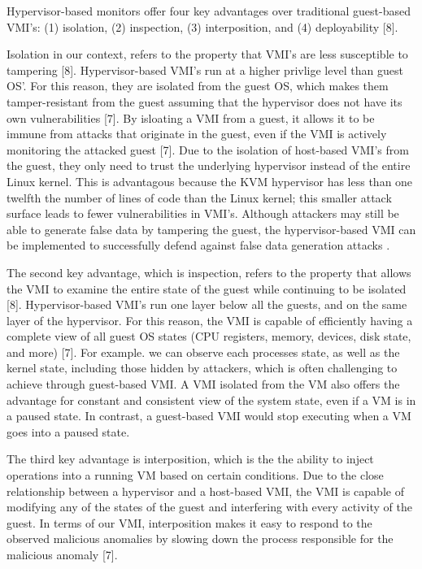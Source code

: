 \documentclass{report}
\begin{document}
\begin{spacing}{1.5}
{\large
Hypervisor-based monitors offer four key advantages over traditional guest-based VMI's: (1) isolation, (2) inspection, (3) interposition, and (4) deployability [8].
\newline
}

{\large
Isolation in our context, refers to the property that VMI's are less susceptible to tampering [8]. Hypervisor-based VMI's run at a higher privlige level than guest OS'. For this reason, they are isolated from the guest OS, which makes them tamper-resistant from the guest assuming that the hypervisor does not have its own vulnerabilities [7]. By isloating a VMI from a guest, it allows it to be immune from attacks that originate in the guest, even if the VMI is actively monitoring the attacked guest [7]. Due to the isolation of host-based VMI's from the guest, they only need to trust the underlying hypervisor instead of the entire Linux kernel. This is advantagous because the KVM hypervisor has less than one twelfth the number of lines of code than the Linux kernel; this smaller attack surface leads to fewer vulnerabilities in VMI's. Although attackers may still be able to generate false data by tampering the guest, the hypervisor-based VMI can be implemented to successfully defend against false data generation attacks .
\newline
}

{\large
The second key advantage, which is inspection, refers to the property that allows the VMI to examine the entire state of the guest while continuing to be isolated [8]. Hypervisor-based VMI's run one layer below all the guests, and on the same layer of the hypervisor. For this reason, the VMI is capable of efficiently having a complete view of all guest OS states (CPU registers, memory, devices, disk state, and more) [7]. For example. we can observe each processes state, as well as the kernel
state, including those hidden by attackers, which is often challenging to achieve through guest-based VMI. A VMI isolated from the VM also offers the advantage for constant and consistent view of the system state, even if a VM is in a paused state. In contrast, a guest-based VMI would stop executing when a VM goes into a paused state. 
\newline
}


{\large
The third key advantage is interposition, which is the the ability to inject operations into a running VM based on certain conditions. Due to the close relationship between a hypervisor and a host-based VMI, the VMI is capable of modifying any of the states of the guest and interfering with every activity of the guest. In terms of our VMI, interposition makes it easy to respond to the observed malicious anomalies by slowing down the process responsible for the malicious anomaly [7].
\newline
}



\end{spacing}
\end{document}
